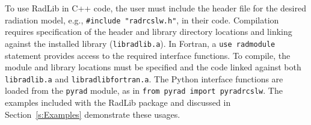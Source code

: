\documentclass[preprint,12pt]{elsarticle}
\begin{document}
To use RadLib in C++ code, the user must include the header file for the desired radiation model, e.g., \texttt{\#include "rad\textunderscore rcslw.h"}, in their code. Compilation requires specification of the header and library directory locations and linking against the installed library (\texttt{libradlib.a}). In Fortran, a \texttt{use rad\textunderscore module} statement provides access to the required interface functions. To compile, the module and library locations must be specified and the code linked against both \texttt{libradlib.a} and \texttt{libradlib\textunderscore fortran.a}. The Python interface functions are loaded from the \texttt{pyrad} module, as in \texttt{from pyrad import pyrad\textunderscore rcslw}. The examples included with the RadLib package and discussed in Section~\ref{s:Examples} demonstrate these usages.
\end{document}

